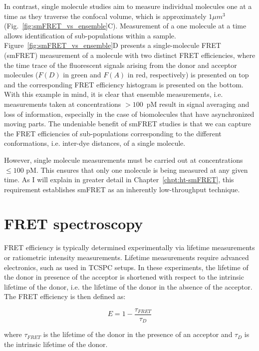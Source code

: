 In contrast, single molecule studies aim to measure individual molecules one at a time as they traverse the confocal volume, which is approximately $1\mu m^3$ (Fig.~\ref{fig:smFRET_vs_ensemble}C).
Measurement of a one molecule at a time allows identification of sub-populations within a sample. 
Figure~\ref{fig:smFRET_vs_ensemble}D presents a single-molecule FRET (\ac{smFRET}) measurement of a molecule with two distinct FRET efficiencies, where the time trace of the fluorescent signals arising from the donor and acceptor molecules ($F(D)$ in green and $F(A)$ in red, respectively) is presented on top and the corresponding FRET efficiency histogram is presented on the bottom.
With this example in mind, it is clear that ensemble measurements, i.e. measurements taken at concentrations $> 100$~pM result in signal averaging and loss of information, especially in the case of biomolecules that have asynchronized moving parts.
The undeniable benefit of smFRET studies is that we can capture the FRET efficiencies of sub-populations corresponding to the different conformations, i.e. inter-dye distances, of a single molecule.

However, single molecule measurements must be carried out at concentrations $\leq 100$ pM.
This ensures that only one molecule is being measured at any given time.
As I will explain in greater detail in Chapter~\ref{chpt:ht-smFRET}, this requirement establishes smFRET as an inherently low-throughput technique.

\section{FRET spectroscopy
\label{sec:FRET_intro}}

FRET efficiency is typically determined experimentally via lifetime measurements or ratiometric intensity measurements.
Lifetime measurements require advanced electronics, such as used in \ac{TCSPC} setups.
In these experiments, the lifetime of the donor in presence of the acceptor is shortened with respect to the intrinsic lifetime of the donor, i.e. the lifetime of the donor in the absence of the acceptor.
The FRET efficiency is then defined as:

\begin{equation}
    \label{eqn: E_lifetime}
    E = 1 - \frac{\tau_{FRET}}{\tau_D}
\end{equation}

\noindent
where $\tau_{FRET}$ is the lifetime of the donor in the presence of an acceptor and $\tau_D$ is the intrinsic lifetime of the donor.

